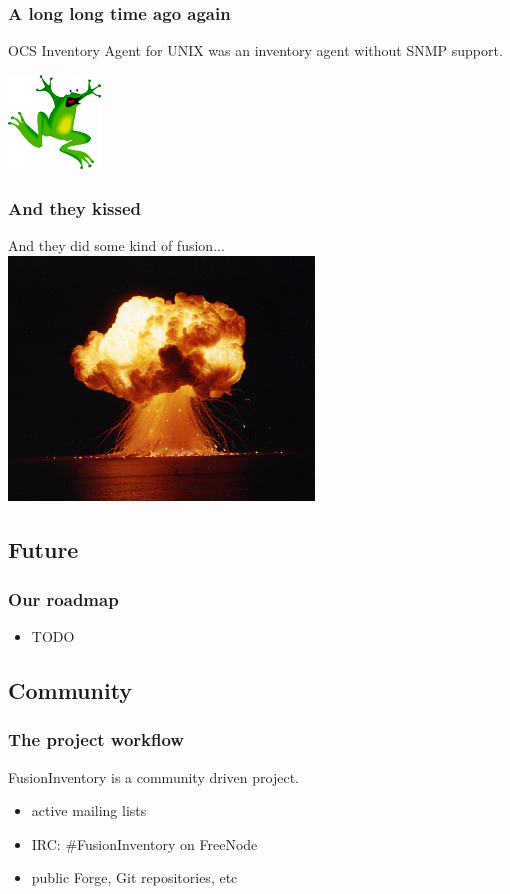 \documentclass{beamer}
\begin{document}
\begin{frame}
    \frametitle{A long long time ago again}
    
    OCS Inventory Agent for UNIX was an inventory agent without SNMP support.

    \includegraphics[height=2.5cm]{./pics/frog2.pdf}
\end{frame}

\begin{frame}
    \frametitle{And they kissed}
    
    And they did some kind of fusion...
    \includegraphics[height=6.5cm]{./pics/explode.jpg}
\end{frame}


\subsection{Future}

\begin{frame}
    \frametitle{Our roadmap}
    \begin{itemize}
        \item TODO
    \end{itemize}
\end{frame}

\subsection{Community}

\begin{frame}
    \frametitle{The project workflow}
    FusionInventory is a community driven project.

    \begin{itemize}
        \item active mailing lists
        \item IRC: \#FusionInventory on FreeNode
        \item public Forge, Git repositories, etc
    \end{itemize}
\end{frame}
\end{document}
